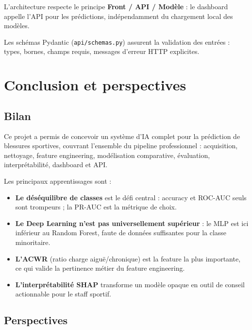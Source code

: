 \documentclass[12pt,a4paper]{report}
\begin{document}
L'architecture respecte le principe \textbf{Front / API / Modèle} : le dashboard appelle
l'API pour les prédictions, indépendamment du chargement local des modèles.

Les schémas Pydantic (\texttt{api/schemas.py}) assurent la validation des entrées :
types, bornes, champs requis, messages d'erreur HTTP explicites.

\chapter{Conclusion et perspectives}

\section{Bilan}

Ce projet a permis de concevoir un système d'IA complet pour la prédiction de blessures
sportives, couvrant l'ensemble du pipeline professionnel : acquisition, nettoyage,
feature engineering, modélisation comparative, évaluation, interprétabilité, dashboard
et API.

Les principaux apprentissages sont :
\begin{itemize}
  \item \textbf{Le déséquilibre de classes} est le défi central : accuracy et ROC-AUC
        seuls sont trompeurs ; la PR-AUC est la métrique de choix.
  \item \textbf{Le Deep Learning n'est pas universellement supérieur} : le MLP est ici
        inférieur au Random Forest, faute de données suffisantes pour la classe minoritaire.
  \item \textbf{L'ACWR} (ratio charge aiguë/chronique) est la feature la plus importante,
        ce qui valide la pertinence métier du feature engineering.
  \item \textbf{L'interprétabilité SHAP} transforme un modèle opaque en outil de conseil
        actionnable pour le staff sportif.
\end{itemize}

\section{Perspectives}
\end{document}
